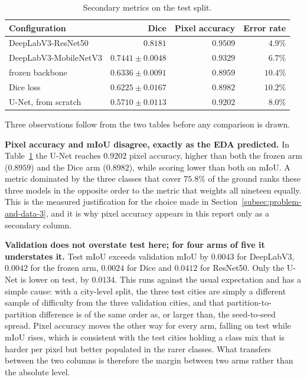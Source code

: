 \begin{table}[H]
\centering
\caption{Secondary metrics on the test split.}
\label{tab:secondary}
\small
\begin{tabular}{lrrr}
\hline
\textbf{Configuration} & \textbf{Dice} & \textbf{Pixel accuracy} & \textbf{Error rate} \\
\hline
DeepLabV3-ResNet50                & $\mathit{0.8181}$ & $\mathit{0.9509}$ & $4.9\%$ \\
DeepLabV3-MobileNetV3             & $\mathbf{0.7441 \pm 0.0048}$ & $0.9329$ & $6.7\%$ \\
\quad frozen backbone             & $0.6336 \pm 0.0091$ & $0.8959$ & $10.4\%$ \\
\quad Dice loss                   & $0.6225 \pm 0.0167$ & $0.8982$ & $10.2\%$ \\
U-Net, from scratch               & $0.5710 \pm 0.0113$ & $0.9202$ & $8.0\%$ \\
\hline
\end{tabular}
\end{table}

Three observations follow from the two tables before any comparison is drawn.

\textbf{Pixel accuracy and mIoU disagree, exactly as the EDA predicted.} In
Table~\ref{tab:secondary} the U-Net reaches $0.9202$ pixel accuracy, higher than both the frozen
arm ($0.8959$) and the Dice arm ($0.8982$), while scoring lower than both on mIoU. A metric
dominated by the three classes that cover $75.8\%$ of the ground ranks these three models in the
opposite order to the metric that weights all nineteen equally. This is the measured
justification for the choice made in Section~\ref{subsec:problem-and-data-3}, and it is why
pixel accuracy appears in this report only as a secondary column.

\textbf{Validation does not overstate test here; for four arms of five it understates it.} Test
mIoU exceeds validation mIoU by $0.0043$ for DeepLabV3, $0.0042$ for the frozen arm, $0.0024$ for
Dice and $0.0412$ for ResNet50. Only the U-Net is lower on test, by $0.0134$. This runs against
the usual expectation and has a simple cause: with a city-level split, the three test cities are
simply a different sample of difficulty from the three validation cities, and that
partition-to-partition difference is of the same order as, or larger than, the seed-to-seed
spread. Pixel accuracy moves the other way for every arm, falling on test while mIoU rises, which
is consistent with the test cities holding a class mix that is harder per pixel but better
populated in the rarer classes. What transfers between the two columns is therefore the margin
between two arms rather than the absolute level.

